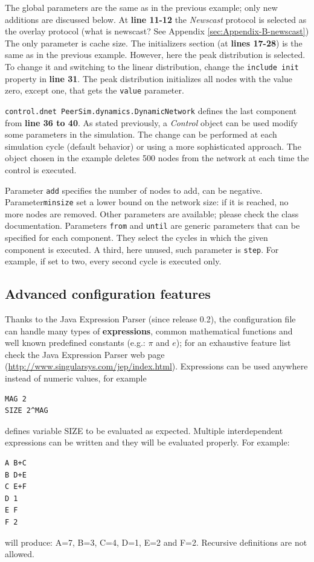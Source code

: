 \documentclass[a4paper,11pt]{article}
\begin{document}
The global parameters are the same as in the previous example; only
new additions are discussed below. At \textbf{line 11-12} the
\emph{Newscast} protocol is selected as the overlay protocol
(what is newscast? See Appendix \ref{sec:Appendix-B-newscast}) 
The only parameter is cache size.
The initializers section (at \textbf{lines 17-28}) is the same as in
the previous example. However, here the peak distribution is
selected. To change it and switching to the linear distribution,
change the \texttt{include init} property in \textbf{line 31}.
The
peak distribution initializes all nodes with the value zero,
except one, that gets the \texttt{value} parameter.

\texttt{control.dnet
PeerSim.dynamics.DynamicNetwork} defines the last component
from \textbf{line 36 to 40}. 
As stated previously, a \emph{Control}
object can be used modify some parameters in the simulation.
The change can be performed at each simulation cycle (default
behavior) or using a more sophisticated approach. The object chosen
in the example deletes 500 nodes from the network at each time
the control is executed.

Parameter \texttt{add} specifies the number of nodes to add, can be negative.
Parameter\texttt{minsize} set a lower bound on the network size: if it is
reached, no more nodes are removed.
Other parameters are available; please check the class documentation.
Parameters \texttt{from} and \texttt{until} are generic parameters that can
be specified for each component.
They select the cycles in which the given component is executed.
A third, here unused, such parameter is \texttt{step}.
For example, if set to two, every second cycle is executed only.

\subsection{Advanced configuration features}

Thanks to the Java Expression Parser (since release
0.2), the configuration
file can handle many types of \textbf{expressions},
common mathematical functions and well known predefined
constants (e.g.: $\pi$ and $e$); for an exhaustive feature list check
the Java Expression Parser web page
(\url{http://www.singularsys.com/jep/index.html}).
Expressions can be used anywhere instead of numeric values, for example
\begin{verbatim}
MAG 2
SIZE 2^MAG
\end{verbatim}
defines variable SIZE to be evaluated as expected.
Multiple interdependent expressions can be written and they will
be evaluated properly. For example:
\begin{verbatim}
A B+C
B D+E
C E+F
D 1
E F
F 2
\end{verbatim}
will produce: A=7, B=3, C=4, D=1, E=2 and F=2.
Recursive definitions are not allowed.
\end{document}
